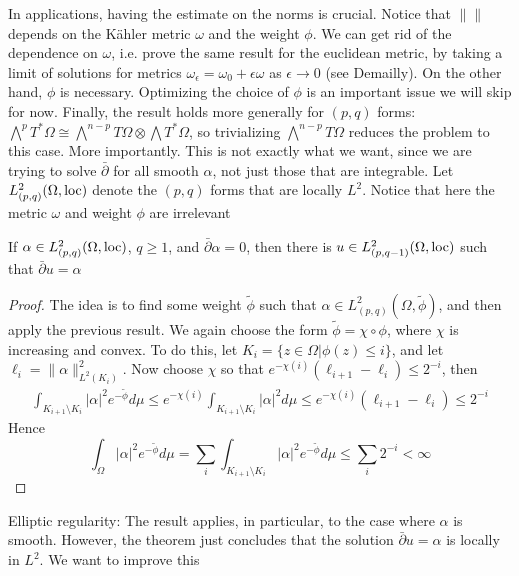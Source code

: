\documentclass[../main.tex]{subfiles}
\begin{document}
\begin{note}
In applications, having the estimate on the norms is crucial. Notice that $\|\|$ depends on the K\"ahler metric $\omega$ and the weight $\phi$. We can get rid of the dependence on $\omega$, i.e. prove the same result for the euclidean metric, by taking a limit of solutions for metrics $\omega_\epsilon=\omega_0+\epsilon\omega$ as $\epsilon\to0$ (see Demailly). On the other hand, $\phi$ is necessary. Optimizing the choice of $\phi$ is an important issue we will skip for now. Finally, the result holds more generally for $(p,q)$ forms: $\bigwedge^pT^*\Omega\cong\bigwedge^{n-p}T\Omega\otimes\bigwedge T^*\Omega$, so trivializing $\bigwedge^{n-p}T\Omega$ reduces the problem to this case. More importantly. This is not exactly what we want, since we are trying to solve $\bar\partial$ for all smooth $\alpha$, not just those that are integrable. Let $L^2_{(p,q)}(\Omega,\operatorname{loc})$ denote the $(p,q)$ forms that are locally $L^2$. Notice that here the metric $\omega$ and weight $\phi$ are irrelevant
\end{note}

\begin{theorem}
If $\alpha\in L^2_{(p,q)}(\Omega,\operatorname{loc})$, $q\geq1$, and $\bar\partial\alpha=0$, then there is $u\in L^2_{(p,q-1)}(\Omega,\operatorname{loc})$ such that $\bar\partial u=\alpha$
\end{theorem}

\begin{proof}
The idea is to find some weight $\tilde\phi$ such that $\alpha\in L^2_{(p,q)}(\Omega,\tilde\phi)$, and then apply the previous result. We again choose the form $\tilde\phi=\chi\circ\phi$, where $\chi$ is increasing and convex. To do this, let $K_i=\{z\in\Omega|\phi(z)\leq i\}$, and let $\ell_i=\|\alpha\|^2_{L^2(K_i)}$. Now choose $\chi$ so that $e^{-\chi(i)}(\ell_{i+1}-\ell_i)\leq 2^{-i}$, then
\begin{align*}
\int_{K_{i+1}\setminus K_i}|\alpha|^2e^{-\tilde\phi}d\mu\leq e^{-\chi(i)}\int_{K_{i+1}\setminus K_i}|\alpha|^2d\mu\leq e^{-\chi(i)}(\ell_{i+1}-\ell_i)\leq 2^{-i}
\end{align*}
Hence
\[\int_\Omega|\alpha|^2e^{-\tilde\phi}d\mu=\sum_i\int_{K_{i+1}\setminus K_i}|\alpha|^2e^{-\tilde\phi}d\mu\leq\sum_i2^{-i}<\infty\]
\end{proof}

Elliptic regularity: The result applies, in particular, to the case where $\alpha$ is smooth. However, the theorem just concludes that the solution $\bar\partial u=\alpha$ is locally in $L^2$. We want to improve this
\end{document}
